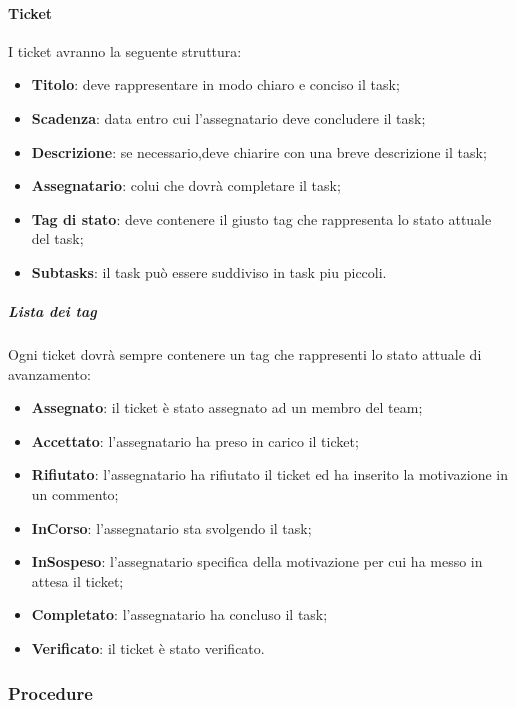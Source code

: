 	\paragraph{Ticket}
	 I ticket avranno la seguente struttura:
	 \begin{itemize}
	 	\item \textbf{Titolo}: deve rappresentare in modo chiaro e conciso il task;
	 	\item \textbf{Scadenza}: data entro cui l'assegnatario deve concludere il task;
	 	\item \textbf{Descrizione}: se necessario,deve chiarire con una breve descrizione il task;
	 	\item \textbf{Assegnatario}: colui che dovrà completare il task;
	 	\item \textbf{Tag di stato}: deve contenere il giusto tag che rappresenta lo stato attuale del task; 
	 	\item \textbf{Subtasks}: il task può essere suddiviso in task piu piccoli.
	 	\end{itemize}
	 	\subparagraph{Lista dei tag}
	 	Ogni ticket dovrà sempre contenere un tag che rappresenti lo stato attuale di avanzamento:
	 	\begin{itemize}
	 		\item \textbf{Assegnato}: il ticket è stato assegnato ad un membro del team;
	 		\item \textbf{Accettato}: l'assegnatario ha preso in carico il ticket;
	 		\item \textbf{Rifiutato}: l'assegnatario ha rifiutato il ticket ed ha inserito la motivazione in un commento;
	 		\item \textbf{InCorso}: l'assegnatario sta svolgendo il task;
	 		\item \textbf{InSospeso}: l'assegnatario specifica della motivazione per cui ha messo in attesa il ticket;
	 		\item \textbf{Completato}: l'assegnatario ha concluso il task;
	 		\item \textbf{Verificato}: il ticket è stato verificato.
	 		\end{itemize}
\subsubsection{Procedure}
